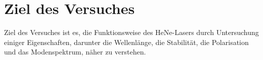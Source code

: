 \section{Ziel des Versuches}
\label{sec:versuchsziel}

Ziel des Versuches ist es, die Funktionsweise des HeNe-Lasers durch Untersuchung einiger Eigenschaften, darunter die Wellenlänge, die Stabilität, die Polarisation und das Modenspektrum, näher zu verstehen.